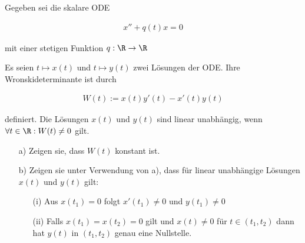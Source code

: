 \begin{exercise}
  Gegeben sei die skalare ODE

  \begin{align*}
    x'' + q(t)x = 0
  \end{align*}

  mit einer stetigen Funktion $q: \R \rightarrow \R$

  Es seien $t \mapsto x(t)$ und $t \mapsto y(t)$ zwei Lösungen der ODE.
  Ihre Wronskideterminante ist durch

  \begin{align*}
    W(t) := x(t)y'(t)-x'(t)y(t)
  \end{align*}

  definiert. Die Lösungen $x(t)$ und $y(t)$ sind linear unabhängig, wenn
  $\forall t \in \R: W(t) \neq 0$ gilt.

  \begin{itemize}
    \item[a)] Zeigen sie, dass $W(t)$ konstant ist.
    \item[b)] Zeigen sie unter Verwendung von a), dass für linear unabhängige Lösungen
    $x(t)$ und $y(t)$ gilt:
    \begin{itemize}
      \item[(i)] Aus $x(t_1) = 0$ folgt $x'(t_1) \neq 0$ und $y(t_1) \neq 0$
      \item[(ii)] Falls $x(t_1)=x(t_2)=0$ gilt und $x(t) \neq 0$ für
      $t \in (t_1 , t_2 )$ dann hat $y(t)$ in $(t_1 , t_2 )$ genau eine Nullstelle.
    \end{itemize}
  \end{itemize}

\end{exercise}

